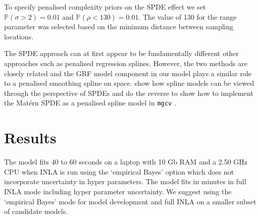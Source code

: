 \documentclass{stylefile16/statsoc}
\begin{document}
To specify penalised complexity priors on the SPDE effect we set $\mathbb{P}(\sigma > 2) = 0.01$ and $\mathbb{P}(\rho < 130) = 0.01$.  The value of 130 for the range parameter was selected based on the minimum distance between sampling locations.  

The SPDE approach can at first appear to be fundamentally different  other approaches such as penalised regression splines.  However, the two methods are closely related and the GRF model component in our model plays a similar role to a penalised smoothing spline on space.  \cite{yue_bayesian_2014} show how spline models can be viewed through the perspective of SPDEs and \cite{ miller_understanding_2019} do the reverse to show how to implement the Mat\'ern SPDE as a penalised spline model in \texttt{mgcv} \citep{wood_gam_2017}.

\section{Results}
\label{sec-results} 

The model fits 40 to 60 seconds on a laptop with 10 Gb RAM and a 2.50 GHz CPU when INLA is run using the `empirical Bayes' option which does not incorporate uncertainty in hyper parameters.  The model fits in minutes in full INLA mode including hyper parameter uncertainty.  We suggest using the `empirical Bayes' mode for model development and full INLA on a smaller subset of candidate models.  
\end{document}
